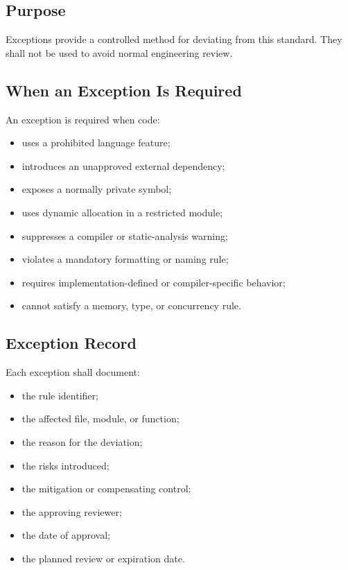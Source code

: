 \subsection{Purpose}

Exceptions provide a controlled method for deviating from this standard. They shall not be used to avoid normal engineering review.

\subsection{When an Exception Is Required}

An exception is required when code:

\begin{itemize}
	\item uses a prohibited language feature;
	\item introduces an unapproved external dependency;
	\item exposes a normally private symbol;
	\item uses dynamic allocation in a restricted module;
	\item suppresses a compiler or static-analysis warning;
	\item violates a mandatory formatting or naming rule;
	\item requires implementation-defined or compiler-specific behavior;
	\item cannot satisfy a memory, type, or concurrency rule.
\end{itemize}

\subsection{Exception Record}

Each exception shall document:

\begin{itemize}
	\item the rule identifier;
	\item the affected file, module, or function;
	\item the reason for the deviation;
	\item the risks introduced;
	\item the mitigation or compensating control;
	\item the approving reviewer;
	\item the date of approval;
	\item the planned review or expiration date.
\end{itemize}

